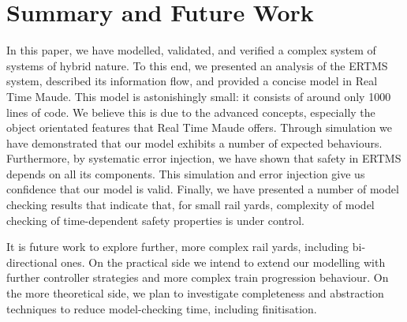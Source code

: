 \section{Summary and Future Work}

In this paper, we have modelled, validated, and verified a complex
system of systems of hybrid nature.
%
%
%
To this end, 
%
we presented an analysis of the ERTMS system,
%
described its information flow,
%
and provided a concise model in Real Time Maude. 
%
This model is astonishingly small: it consists of around only 1000
lines of code. We believe this is due to the advanced concepts,
especially the object orientated features that Real Time Maude offers.
%
Through simulation we have demonstrated that our model exhibits a
number of expected behaviours.
%
Furthermore, by systematic error injection, we have shown that safety
in ERTMS depends on all its components. 
%
This simulation and error injection give us confidence that our model
is valid.
%
Finally, we have presented a number of model checking results that
indicate that, for small rail yards, complexity of model checking of
time-dependent safety properties is under control.

It is future work to explore further, more complex rail yards,
including bi-directional ones. On the practical side we intend to
extend our modelling with further controller strategies and more
complex train progression behaviour. On the more theoretical side, we
plan to investigate completeness and abstraction techniques to reduce
model-checking time, including finitisation.
